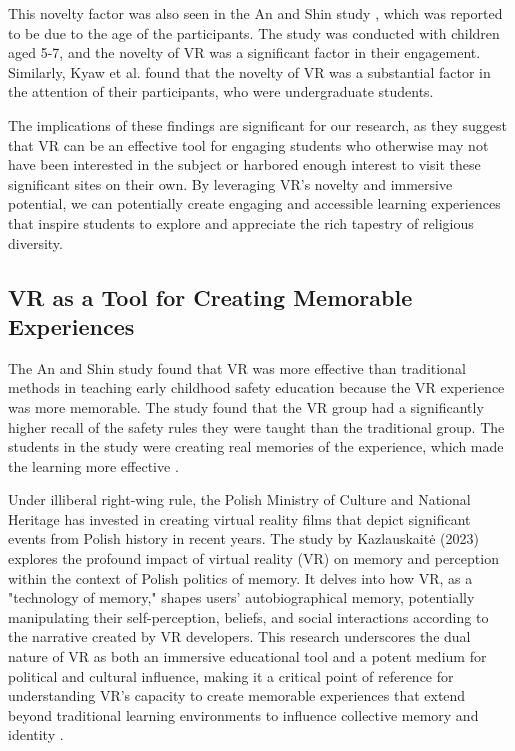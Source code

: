 \documentclass[conference]{IEEEtran}
\begin{document}
This novelty factor was also seen in the An and Shin study \cite{an_teachers_2023}, which was reported to be due to the age of the participants. The study was conducted with children aged 5-7, and the novelty of VR was a significant factor in their engagement. Similarly, Kyaw et al. \cite{kyaw_comparing_2023} found that the novelty of VR was a substantial factor in the attention of their participants, who were undergraduate students.

The implications of these findings are significant for our research, as they suggest that VR can be an effective tool for engaging students who otherwise may not have been interested in the subject or harbored enough interest to visit these significant sites on their own. By leveraging VR's novelty and immersive potential, we can potentially create engaging and accessible learning experiences that inspire students to explore and appreciate the rich tapestry of religious diversity.

\subsection{VR as a Tool for Creating Memorable Experiences}
The An and Shin study \cite{an_teachers_2023} found that VR was more effective than traditional methods in teaching early childhood safety education because the VR experience was more memorable. The study found that the VR group had a significantly higher recall of the safety rules they were taught than the traditional group. The students in the study were creating real memories of the experience, which made the learning more effective \cite{an_teachers_2023}.

Under illiberal right-wing rule, the Polish Ministry of Culture and National Heritage has invested in creating virtual reality films that depict significant events from Polish history in recent years. The study by Kazlauskaitė (2023) explores the profound impact of virtual reality (VR) on memory and perception within the context of Polish politics of memory. It delves into how VR, as a "technology of memory," shapes users' autobiographical memory, potentially manipulating their self-perception, beliefs, and social interactions according to the narrative created by VR developers. This research underscores the dual nature of VR as both an immersive educational tool and a potent medium for political and cultural influence, making it a critical point of reference for understanding VR's capacity to create memorable experiences that extend beyond traditional learning environments to influence collective memory and identity \cite{ruta_polish_2023}.
\end{document}

